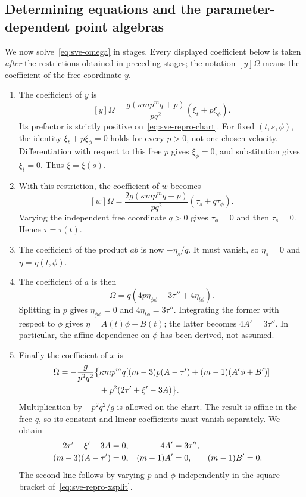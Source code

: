 \documentclass[11pt]{article}
\theoremstyle{definition}
\begin{document}
\subsection{Determining equations and the parameter-dependent point algebras}
We now solve~\eqref{eq:sve-omega} in stages. Every displayed coefficient
below is taken \emph{after} the restrictions obtained in preceding stages;
the notation $[y]\Omega$ means the coefficient of the free coordinate $y$.
\begin{enumerate}
\item The coefficient of $y$ is
\[
 [y]\Omega=\frac{g(\kappa mp^mq+p)}{pq^2}(\xi_t+p\xi_\phi).
\]
Its prefactor is strictly positive on~\eqref{eq:sve-repro-chart}.
For fixed $(t,s,\phi)$, the identity $\xi_t+p\xi_\phi=0$ holds for
every $p>0$, not one chosen velocity. Differentiation with respect to this
free $p$ gives $\xi_\phi=0$, and substitution gives $\xi_t=0$.
Thus $\xi=\xi(s)$.
\item With this restriction, the coefficient of $w$ becomes
\[
 [w]\Omega=\frac{2g(\kappa mp^mq+p)}{pq^2}(\tau_s+q\tau_\phi).
\]
Varying the independent free coordinate $q>0$ gives $\tau_\phi=0$
and then $\tau_s=0$. Hence $\tau=\tau(t)$.
\item The coefficient of the product $ab$ is now $-\eta_s/q$.
It must vanish, so $\eta_s=0$ and $\eta=\eta(t,\phi)$.
\item The coefficient of $a$ is then
\begin{equation}
 [a]\Omega=q(4p\eta_{\phi\phi}-3\tau''+4\eta_{t\phi}).
 \label{eq:sve-repro-split}
\end{equation}
Splitting in $p$ gives $\eta_{\phi\phi}=0$ and
$4\eta_{t\phi}=3\tau''$. Integrating the former with respect to
$\phi$ gives $\eta=A(t)\phi+B(t)$; the latter becomes $4A'=3\tau''$.
In particular, the affine dependence on $\phi$ has been derived, not assumed.
\item Finally the coefficient of $x$ is
\begin{align}
 [x]\Omega=-\frac{g}{p^2q^2}\big\{&\kappa mp^mq
     [(m-3)p(A-\tau')+(m-1)(A'\phi+B')]\notag\\
     &+p^2(2\tau'+\xi'-3A)\big\}.
 \label{eq:sve-repro-xsplit}
\end{align}
Multiplication by $-p^2q^2/g$ is allowed on the chart. The result is
affine in the free $q$, so its constant and linear coefficients must
vanish separately. We obtain
\begin{align}
 2\tau'+\xi'-3A&=0, &4A'&=3\tau'',\notag\\
 (m-3)(A-\tau')&=0,&(m-1)A'&=0,&(m-1)B'&=0.
 \label{eq:sve-final-determining}
\end{align}
The second line follows by varying $p$ and $\phi$ independently in the
square bracket of~\eqref{eq:sve-repro-xsplit}.
\end{enumerate}
\end{document}

